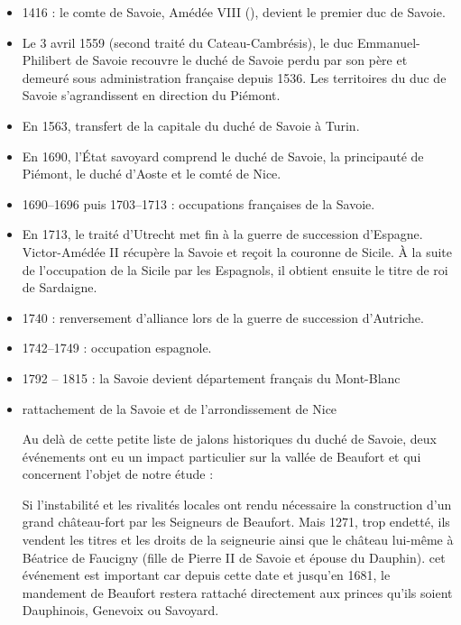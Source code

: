 \documentclass[12pt,a4paper]{report}
\begin{document}
\begin{itemize}
	
	
	\item 1416 : le comte de Savoie, Amédée VIII (), devient le premier duc de Savoie.
	
	\item Le 3 avril 1559 (second traité du Cateau-Cambrésis), le duc Emmanuel-Philibert de Savoie recouvre le duché de Savoie perdu par son père et demeuré sous administration française depuis 1536. Les territoires du duc de Savoie s’agrandissent en direction du Piémont.
	
	\item En 1563, transfert de la capitale du duché de Savoie à Turin.
	
	\item En 1690, l’État savoyard comprend le duché de Savoie, la principauté de Piémont, le duché d’Aoste et le comté de Nice.
	
	\item 1690--1696 puis 1703--1713 : occupations françaises de la Savoie.
	
	\item En 1713, le traité d’Utrecht met fin à la guerre de succession d’Espagne. Victor-Amédée II récupère la Savoie et reçoit la couronne de Sicile. À la suite de l’occupation de la Sicile par les Espagnols, il obtient ensuite le titre de roi de Sardaigne.
	\item 1740 : renversement d’alliance lors de la guerre de succession d’Autriche.
	
	\item 1742--1749 : occupation espagnole.
	
	\item 1792 -- 1815 : la Savoie devient département français du Mont-Blanc
	
	\item rattachement de la Savoie et de l'arrondissement de Nice
	
	
	Au delà de cette petite liste de jalons historiques du duché de Savoie, deux événements ont eu un impact particulier sur la vallée de Beaufort et qui concernent l'objet de notre étude : 
	
	Si l'instabilité et les rivalités locales ont rendu nécessaire la construction d'un grand château-fort par les Seigneurs de Beaufort. Mais 1271, trop endetté, ils vendent les titres et les droits de la seigneurie ainsi que le château lui-même à Béatrice de Faucigny (fille de Pierre II de Savoie et épouse du Dauphin). cet événement est important car depuis cette date et jusqu'en 1681, le mandement de Beaufort restera  rattaché directement aux princes qu'ils soient Dauphinois, Genevoix ou Savoyard.
	

\end{itemize}
\end{document}
